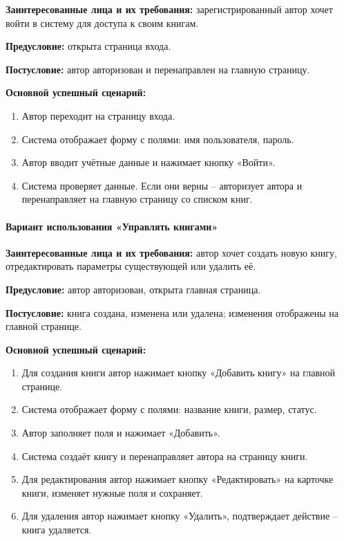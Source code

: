 \textbf{Заинтересованные лица и их требования:} зарегистрированный автор хочет войти в систему для доступа к своим книгам.

\textbf{Предусловие:} открыта страница входа.

\textbf{Постусловие:} автор авторизован и перенаправлен на главную страницу.

\textbf{Основной успешный сценарий:}
\begin{enumerate}
    \item Автор переходит на страницу входа.
    \item Система отображает форму с полями: имя пользователя, пароль.
    \item Автор вводит учётные данные и нажимает кнопку «Войти».
    \item Система проверяет данные. Если они верны -- авторизует автора и перенаправляет на главную страницу со списком книг.
\end{enumerate}

\paragraph{Вариант использования «Управлять книгами»}

\textbf{Заинтересованные лица и их требования:} автор хочет создать новую книгу, отредактировать параметры существующей или удалить её.

\textbf{Предусловие:} автор авторизован, открыта главная страница.

\textbf{Постусловие:} книга создана, изменена или удалена; изменения отображены на главной странице.

\textbf{Основной успешный сценарий:}
\begin{enumerate}
    \item Для создания книги автор нажимает кнопку «Добавить книгу» на главной странице.
    \item Система отображает форму с полями: название книги, размер, статус.
    \item Автор заполняет поля и нажимает «Добавить».
    \item Система создаёт книгу и перенаправляет автора на страницу книги.
    \item Для редактирования автор нажимает кнопку «Редактировать» на карточке книги, изменяет нужные поля и сохраняет.
    \item Для удаления автор нажимает кнопку «Удалить», подтверждает действие -- книга удаляется.
\end{enumerate}

